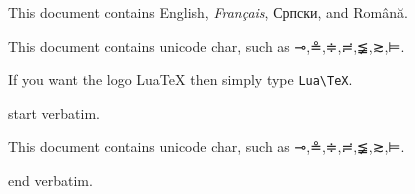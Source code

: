 \documentclass[a4paper]{article}
\begin{document}
This document contains English, \textit{Français}, Српски,
and Rom\^an\u{a}.

This document contains unicode char, such as ⊸,≗,≑,≓,≨,≳,⊨.

{\sffamily
If you want the logo {Lua\TeX} then simply type \verb|Lua\TeX|.}

\begin{verbatim*}
start verbatim.

This document contains unicode char, such as ⊸,≗,≑,≓,≨,≳,⊨.

end verbatim.
\end{verbatim*}
\end{document}
